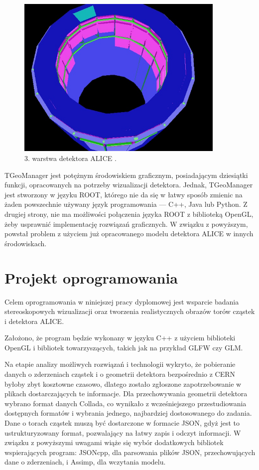 \begin{figure}[H]
		\centering
 		\includegraphics[width=10.0cm]{geometry.jpg}
    	\caption{3. warstwa detektora ALICE \cite{TGeoManager}.}
 		\label{rys27}
\end{figure}

TGeoManager jest potężnym środowiskiem graficznym, posiadającym dziesiątki funkcji, opracowanych na potrzeby wizualizacji detektora. Jednak, TGeoManager jest stworzony w języku ROOT, którego nie da się w łatwy sposób zmienic na żaden powszechnie używany język programowania --- C++, Java lub Python. Z drugiej strony, nie ma możliwości połączenia języka ROOT z biblioteką OpenGL, żeby usprawnić implementację rozwiązań graficznych. W związku z powyższym, powstał problem z użyciem już opracowanego modelu detektora ALICE w innych środowiskach.

\newpage
\section{Projekt oprogramowania}
Celem oprogramowania w niniejszej pracy dyplomowej jest wsparcie badania stereoskopowych wizualizacji oraz tworzenia realistycznych obrazów torów cząstek i detektora ALICE. 

Założono, że program będzie wykonany w języku C++ z użyciem biblioteki OpenGL i bibliotek towarzyszących, takich jak na przykład  GLFW czy GLM.

Na etapie analizy możliwych rozwiązań i technologii wykryto, że pobieranie danych o zderzeniach cząstek i o geometrii detektora bezpośrednio z CERN byłoby zbyt kosztowne czasowo, dlatego zostało zgłoszone zapotrzebowanie w plikach dostarczających te informacje. Dla przechowywania geometrii detektora wybrano format danych Collada, co wynikało z wcześniejszego przestudiowania dostępnych formatów i wybrania jednego, najbardziej dostosowanego do zadania. Dane o torach cząstek muszą być dostarczone w formacie JSON, gdyż jest to ustrukturyzowany format, pozwalający na łatwy zapis i odczyt informacji. W związku z powyższymi uwagami wiąże się wybór dodatkowych bibliotek wspierających program: JSONcpp, dla parsowania plików JSON, przechowujących dane o zderzeniach, i Assimp, dla wczytania modelu.

